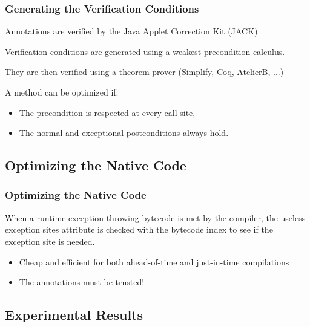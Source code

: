 \documentclass{beamer}
\begin{document}
\begin{frame}
\frametitle{Generating the Verification Conditions}

Annotations are verified by the Java Applet Correction Kit (JACK).

Verification conditions are generated using a weakest precondition calculus.

They are then verified using a theorem prover (Simplify, Coq, AtelierB, ...)

A method can be optimized if:
\begin{itemize}
\item The precondition is respected at every call site,
\item The normal and exceptional postconditions always hold.
\end{itemize}


\end{frame}

\subsection{Optimizing the Native Code}

\begin{frame}
\frametitle{Optimizing the Native Code}

When a runtime exception throwing bytecode is met by the compiler, the useless exception sites attribute is checked with the bytecode index to see if the exception site is needed.

\begin{itemize}
\item Cheap and efficient for both ahead-of-time and just-in-time compilations
\item The annotations must be trusted!
\end{itemize}

\end{frame}

\subsection{Experimental Results}
\end{document}

